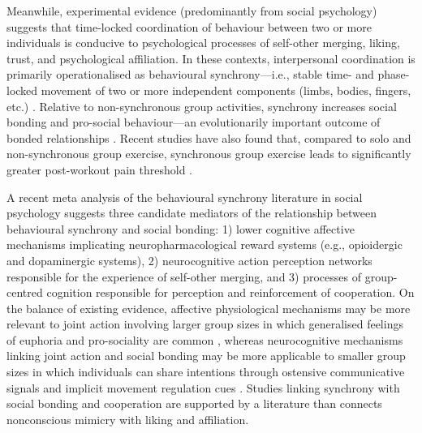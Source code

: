 \begin{CJK}{UTF8}{gbsn}
Meanwhile, experimental evidence (predominantly from social psychology) suggests that time-locked coordination of behaviour between two or more individuals is conducive to psychological processes of self-other merging, liking, trust, and psychological affiliation.  In these contexts, interpersonal coordination is primarily operationalised as behavioural synchrony---i.e., stable time- and phase-locked movement of two or more independent components (limbs, bodies, fingers, etc.) \citep{Pikovsky2007}.  Relative to non-synchronous group activities, synchrony increases social bonding and pro-social behaviour---an evolutionarily important outcome of bonded relationships \citep{Reddish2013,Reddish2013a,Wiltermuth2009}.  Recent studies have also found that, compared to solo and non-synchronous group exercise, synchronous group exercise leads to significantly greater post-workout pain threshold \citep{Cohen2009,Sullivan2014,Sullivan2013a, Sullivan2013b}.

A recent meta analysis of the behavioural synchrony literature in social psychology suggests three candidate mediators of the relationship between behavioural synchrony and social bonding: 1) lower cognitive affective mechanisms implicating neuropharmacological reward systems (e.g., opioidergic and dopaminergic systems), 2) neurocognitive action perception networks responsible for the experience of self-other merging, and 3) processes of group-centred cognition responsible for perception and reinforcement of cooperation\citep{Mogan2017}.  On the balance of existing evidence,
affective physiological mechanisms may be more relevant to joint action involving larger group sizes in which generalised feelings of euphoria and pro-sociality are common \citep[][e.g., mass religious rituals or music festivals]{Weinstein2016}, whereas neurocognitive mechanisms linking joint action and social bonding may be more applicable to smaller group sizes in which individuals can share intentions through ostensive communicative signals and implicit movement regulation cues \citep{Semin2008,Frith2010}.  Studies linking synchrony with social bonding and cooperation are supported by a literature than connects nonconscious mimicry with liking and affiliation\citep{VanBaaren2009}.


\end{CJK}
